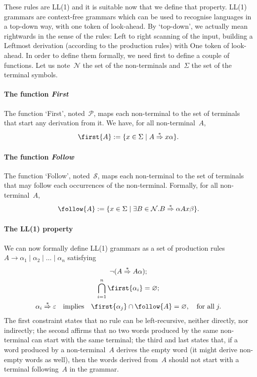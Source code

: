 These rules are LL(1) and it is suitable now that we define that
property. LL(1) grammars are context\hyp{}free grammars which can be
used to recognise languages in a top\hyp{}down way, with one token of
look\hyp{}ahead. By `top\hyp{}down', we actually mean rightwards in
the sense of the rules: Left to right scanning of the input, building
a Leftmost derivation (according to the production rules) with One
token of look\hyp{}ahead. In order to define them formally, we need
first to define a couple of functions. Let us note~\(\mathcal{N}\) the
set of the non\hyp{}terminals and~\(\Sigma\) the set of the terminal
symbols.

\paragraph{The function \emph{First}}

The function `First', noted~\(\mathcal{P}\), maps each
non\hyp{}terminal to the set of terminals that start any derivation
from it. We have, for all non\hyp{}terminal~\(A\),
\begin{equation*}
\first{A} := \{ x \in \Sigma \mid A \stackrel{*}{\Rightarrow} x
\alpha\}.
\end{equation*}

\paragraph{The function \emph{Follow}}

The function `Follow', noted~\(\mathcal{S}\), maps each
non\hyp{}terminal to the set of terminals that may follow each
occurrences of the non\hyp{}terminal. Formally, for all
non\hyp{}terminal~\(A\),
\begin{equation*}
\follow{A} := \{x \in \Sigma \mid \exists B \in \mathcal{N}.B
\stackrel{*}{\Rightarrow} \alpha A x \beta\}.
\end{equation*}

\paragraph{The LL(1) property}

We can now formally define LL(1) grammars as a set of production rules
\(A \rightarrow \alpha_1 \mid \alpha_2 \mid \ldots \mid \alpha_n\)
satisfying
\begin{gather}
\neg(A \stackrel{*}{\Rightarrow} A \alpha);\label{P1}\\
\bigcap_{i=1}^{n} \first{\alpha_i} = \varnothing;\label{P2}\\
\alpha_i \stackrel{*}{\Rightarrow} \varepsilon \quad \text{implies} \quad
\first{\alpha_j} \cap \follow{A} = \varnothing, \quad \text{for all}
\; j.\label{P3}
\end{gather}
The first constraint states that no rule can be left\hyp{}recursive,
neither directly, nor indirectly; the second affirms that no two words
produced by the same non\hyp{}terminal can start with the same
terminal; the third and last states that, if a word produced by a
non\hyp{}terminal~\(A\) derives the empty word (it might derive
non\hyp{}empty words as well), then the words derived from~\(A\)
should not start with a terminal following~\(A\) in the grammar.

